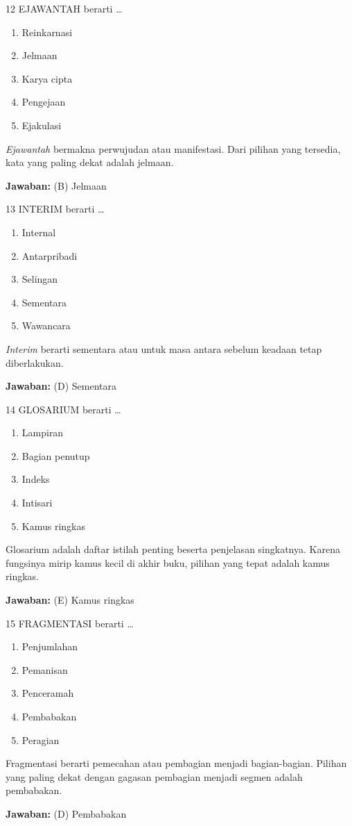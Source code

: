 \documentclass[11pt]{article}
\newenvironment{pil}{\begin{enumerate}[label=(\Alph*),leftmargin=*,itemsep=1pt,topsep=3pt]}{\end{enumerate}}
\newcommand{\jw}[1]{\par\smallskip\begin{jawbox}\textbf{Jawaban:} #1\end{jawbox}}
\begin{document}
\begin{soalbox}{1}{2}
EJAWANTAH berarti \ldots
\begin{pil}\item Reinkarnasi \item Jelmaan \item Karya cipta \item Pengejaan \item Ejakulasi\end{pil}
\end{soalbox}
\begin{pembox}
\emph{Ejawantah} bermakna perwujudan atau manifestasi. Dari pilihan yang tersedia, kata yang paling dekat adalah jelmaan.
\jw{(B) Jelmaan}
\end{pembox}

\begin{soalbox}{1}{3}
INTERIM berarti \ldots
\begin{pil}\item Internal \item Antarpribadi \item Selingan \item Sementara \item Wawancara\end{pil}
\end{soalbox}
\begin{pembox}
\emph{Interim} berarti sementara atau untuk masa antara sebelum keadaan tetap diberlakukan.
\jw{(D) Sementara}
\end{pembox}

\begin{soalbox}{1}{4}
GLOSARIUM berarti \ldots
\begin{pil}\item Lampiran \item Bagian penutup \item Indeks \item Intisari \item Kamus ringkas\end{pil}
\end{soalbox}
\begin{pembox}
Glosarium adalah daftar istilah penting beserta penjelasan singkatnya. Karena fungsinya mirip kamus kecil di akhir buku, pilihan yang tepat adalah kamus ringkas.
\jw{(E) Kamus ringkas}
\end{pembox}

\begin{soalbox}{1}{5}
FRAGMENTASI berarti \ldots
\begin{pil}\item Penjumlahan \item Pemanisan \item Penceramah \item Pembabakan \item Peragian\end{pil}
\end{soalbox}
\begin{pembox}
Fragmentasi berarti pemecahan atau pembagian menjadi bagian-bagian. Pilihan yang paling dekat dengan gagasan pembagian menjadi segmen adalah pembabakan.
\jw{(D) Pembabakan}
\end{pembox}
\end{document}
